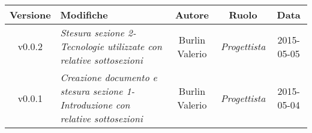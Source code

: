 \newpage

\begin{table}[h]
\centering
\begin{tabular}{|c|p{}|c|c|c|}
	\toprule
	\textbf{Versione} & \textbf{Modifiche} & \textbf{Autore} & \textbf{Ruolo} & \textbf{Data} \\
	\midrule
	\midrule
		v0.0.2 & \textit{Stesura sezione 2-Tecnologie utilizzate con relative sottosezioni} & Burlin Valerio & \textit{Progettista} & 2015-05-05\\
	\midrule
		v0.0.1 & \textit{Creazione documento e stesura sezione 1-Introduzione con relative sottosezioni} & Burlin Valerio & \textit{Progettista} & 2015-05-04\\
	\bottomrule
\end{tabular}
\end{table}
\newpage
